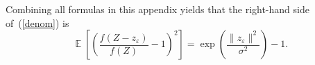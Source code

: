 \documentclass[]{fairmeta}
\DeclareMathOperator{\E}{\mathop{}\mathbb{E}}
\renewcommand{\epsilon}{\varepsilon}
\begin{document}
Combining all formulas in this appendix yields that the right-hand side
of~(\ref{denom}) is
%
\begin{equation}
\E\left[\left( \frac{f(Z-z_{\epsilon})}{f(Z)} - 1\right)^2 \right]
= \exp\left(\frac{\|z_{\epsilon}\|^2}{\sigma^2}\right) - 1.
\end{equation}





\end{document}
